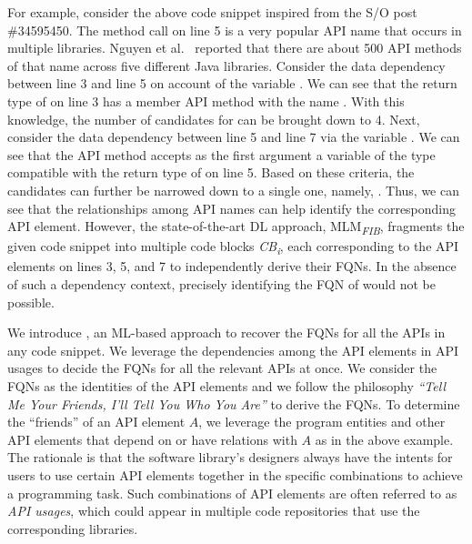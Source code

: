 For example, consider the above code snippet inspired from the S/O post \#34595450. The  method call on line 5 is a very popular API name that occurs in multiple libraries. Nguyen et al.~\cite{icse18} reported that there are about 500 API methods of that name across five different Java libraries. Consider the data dependency between line 3 and line 5 on account of the variable . We can see that the return type of  on line 3 has a member API method with the name . With this knowledge, the number of candidates for  can be brought down to 4. Next, consider the data dependency between line 5 and line 7 via the variable . We can see that the API method  accepts as the first argument a variable of the type compatible with the return type of  on line 5. Based on these criteria, the candidates can further be narrowed down to a single one, namely, . Thus, we can see that the relationships among API names can help identify the corresponding API element. However, the state-of-the-art DL approach, MLM\textsubscript{\textit{FIB}}, fragments the given code snippet into multiple code blocks \textit{CB\textsubscript{i}}, each corresponding to the API elements on lines 3, 5, and 7 to independently derive their FQNs. In the absence of such a dependency context, precisely identifying the FQN of  would not be possible.

We introduce {\tool}, an ML-based approach to recover the FQNs for all
the APIs in any code snippet. We leverage the dependencies among the
API elements in API usages to decide the FQNs for all the relevant
APIs at once. We consider the FQNs as the identities of the API
elements and we follow the philosophy {\em ``Tell Me Your Friends,
  I'll Tell You Who You Are''} to derive the FQNs. To determine the
``friends'' of an API element $A$, we leverage the program entities
and other API elements that depend on or have relations with $A$ as in
the above example. The rationale is that the software library's
designers always have the intents for users to use certain API
elements together in the specific combinations to achieve a
programming task. Such combinations of API elements are often referred
to as {\em API usages}, which could appear in multiple code
repositories that use the corresponding libraries.


